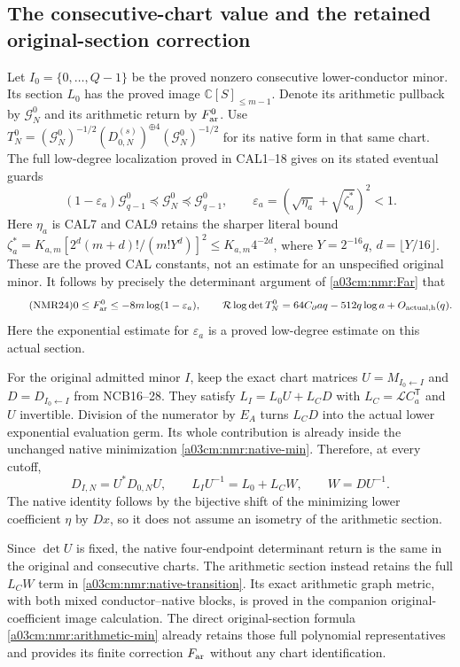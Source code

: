 \subsection{The consecutive-chart value and the retained original-section correction}
Let $I_0=\{0,\ldots,Q-1\}$ be the proved nonzero consecutive
lower-conductor minor. Its section $L_0$ has the proved image
$\mathbb C[S]_{\leq m-1}$. Denote its arithmetic pullback by
$\mathcal G_N^0$ and its arithmetic return by $F_{\rm ar}^0$.
Use $T_N^0=(\mathcal G_N^0)^{-1/2}
 (D_{0,N}^{(s)})^{\oplus4}(\mathcal G_N^0)^{-1/2}$ for its
native form in that same chart.
The full low-degree localization proved in CAL1--18 gives on its
stated eventual guards
\[
(1-\varepsilon_a)\mathcal G_{q-1}^0
\preceq\mathcal G_N^0\preceq\mathcal G_{q-1}^0,\qquad
\varepsilon_a=(\sqrt{\eta_a}+\sqrt{\zeta_a^*})^2<1 .
\]
Here $\eta_a$ is CAL7 and CAL9 retains the sharper literal bound
$\zeta_a^*=K_{a,m}[2^d(m+d)!/(m!Y^d)]^2\leq K_{a,m}4^{-2d}$,
where $Y=2^{-16}q$, $d=\lfloor Y/16\rfloor$.
These are the proved CAL constants, not an estimate for an
unspecified original minor.
It follows by precisely the determinant argument of
\eqref{a03cm:nmr:Far} that
\begin{equation}\tag{NMR24}\label{a03cm:nmr:consecutive-return}
0\leq F_{\rm ar}^0\leq-8m\log(1-\varepsilon_a),\qquad
\mathcal R\log\det T_N^0
=64C_\partial aq-512q\log a+O_{\rm actual,h}(q).
\end{equation}
Here the exponential estimate for $\varepsilon_a$ is a proved
low-degree estimate on this actual section.

For the original admitted minor $I$, keep the exact chart matrices
$U=M_{I_0\leftarrow I}$ and $D=D_{I_0\leftarrow I}$ from NCB16--28.
They satisfy
$L_I=L_0U+L_CD$ with $L_C=\mathcal LC_a^{\mathsf T}$ and $U$
invertible. Division of the numerator by $E_A$ turns $L_CD$ into
the actual lower exponential evaluation germ. Its whole contribution
is already inside the unchanged native minimization
\eqref{a03cm:nmr:native-min}. Therefore, at every cutoff,
\begin{equation}\tag{NMR25}\label{a03cm:nmr:native-transition}
D_{I,N}=U^*D_{0,N}U,\qquad
L_IU^{-1}=L_0+L_CW,\qquad W=DU^{-1}.
\end{equation}
The native identity follows by the bijective shift of the minimizing
lower coefficient $\eta$ by $Dx$, so it does not assume an isometry
of the arithmetic section.

Since $\det U$ is fixed, the native four-endpoint determinant return
is the same in the original and consecutive charts. The arithmetic
section instead retains the full $L_CW$ term in
\eqref{a03cm:nmr:native-transition}. Its exact arithmetic graph metric,
with both mixed conductor--native blocks, is proved in the companion
original-coefficient image calculation. The direct original-section
formula \eqref{a03cm:nmr:arithmetic-min} already retains those full
polynomial representatives and provides its finite correction
$F_{\rm ar}$ without any chart identification.

